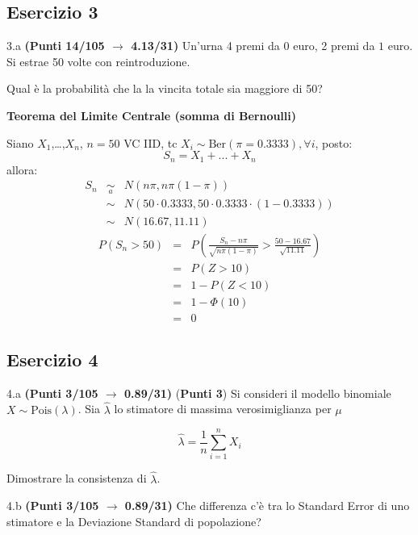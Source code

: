\documentclass[
  11pt,
]{book}
\theoremstyle{mytheoremstyle}
\theoremstyle{mydefstyle}
\newenvironment{sol}
  {
  \begin{tcolorbox}[enhanced,breakable,arc=0.1mm,boxrule=1pt,colback=white,colframe=iblue,
  title=\bf \fontfamily{lmss}\selectfont \hspace{.5 cm} Soluzione,drop fuzzy shadow]

}{
\end{tcolorbox}
  }
\begin{document}
\subsection{Esercizio 3}\label{esercizio-3-36}

3.a \textbf{(Punti 14/105 \(\rightarrow\) 4.13/31)} Un'urna 4 premi da \(\mbox{0}\) euro, 2 premi da \(\mbox{1}\) euro.
Si estrae 50 volte con reintroduzione.

Qual è la probabilità che la la vincita totale sia maggiore di 50?

\begin{sol}
\textbf{Teorema del Limite Centrale (somma di Bernoulli)}

Siano \(X_1\),\ldots,\(X_n\), \(n=50\) VC IID, tc \(X_i\sim\text{Ber}(\pi=0.3333)\)\(,\forall i\), posto:
\[
      S_n = X_1 + ... + X_n
      \]
allora:\begin{eqnarray*}
  S_n & \mathop{\sim}\limits_{a}& N(n\pi,n\pi(1-\pi)) \\
      &\sim & N(50\cdot0.3333,50\cdot0.3333\cdot(1-0.3333)) \\
      &\sim & N(16.67,11.11)
  \end{eqnarray*}\begin{eqnarray*}
      P( S_n   >   50 ) 
        &=& P\left(  \frac { S_n  -  n\pi }{ \sqrt{n\pi(1-\pi)} }  >  \frac { 50  -  16.67 }{\sqrt{ 11.11 }} \right)  \\
                 &=& P\left(  Z   >   10 \right) \\    &=& 1-P(Z< 10 )\\ 
                 &=&  1-\Phi( 10 ) \\ &=&  0 
      \end{eqnarray*}

\end{sol}

\subsection{Esercizio 4}\label{esercizio-4-36}

4.a \textbf{(Punti 3/105 \(\rightarrow\) 0.89/31)} (\textbf{Punti 3}) Si consideri il modello binomiale \(X\sim\text{Pois}(\lambda)\). Sia \(\hat\lambda\) lo stimatore di massima verosimiglianza per \(\mu\)

\[
  \hat\lambda = \frac 1n \sum_{i=1}^n X_i
\]

Dimostrare la consistenza di \(\hat\lambda\).

4.b \textbf{(Punti 3/105 \(\rightarrow\) 0.89/31)} Che differenza c'è tra lo Standard Error di uno stimatore e la Deviazione Standard di popolazione?
\end{document}
